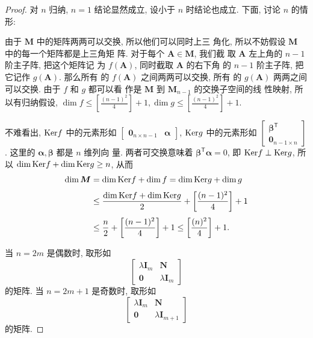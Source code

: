 \documentclass[a4paper, 12pt, UTF8]{ctexart}
\begin{document}
{\color{GoogleRed}
  \begin{proof}
      对 $n$ 归纳, $n=1$ 结论显然成立, 设小于 $n$ 时结论也成立. 下面,
      讨论 $n$ 的情形:

      由于 $\boldsymbol{M}$ 中的矩阵两两可以交换, 所以他们可以同时上三
      角化, 所以不妨假设 $\boldsymbol{M}$ 中的每一个矩阵都是上三角矩
      阵. 对于每个 $\boldsymbol{A} \in \boldsymbol{M}$, 我们截
      取 $\boldsymbol{A}$ 左上角的 $n-1$ 阶主子阵, 把这个矩阵记
      为 $f(\boldsymbol{A})$, 同时截取 $\boldsymbol{A}$ 的右下角
      的 $n-1$ 阶主子阵, 把它记作 $g(\boldsymbol{A})$. 那么所有
      的 $f(\boldsymbol{A})$ 之间两两可以交换, 所有
      的 $g(\boldsymbol{A})$ 两两之间可以交换. 由于 $f$ 和 $g$ 都可以看
      作是 $\boldsymbol{M}$ 到 $\boldsymbol{M}_{n-1}$ 的交换子空间的线
      性映射, 所以有归纳假设,
      $\dim f \leq \left[ \frac{(n-1)^{2}}{4} \right]+1, \dim g \leq
      \left[ \frac{(n-1)^{2}}{4} \right]+1$.

      不难看出, ${\rm Ker} f$ 中的元素形如 $
      \begin{bmatrix}
          \boldsymbol{0}_{n\times n-1} & \bm{\alpha}
      \end{bmatrix}$, ${\rm Ker} g$ 中的元素形如
      $\begin{bmatrix} \bm{\beta}^{\mathsf T} \\
          \boldsymbol{0}_{n-1\times n}
      \end{bmatrix}$. 这里的 $\bm{\alpha}, \bm{\beta}$ 都是 $n$ 维列向
      量. 两者可交换意味着 $\bm{\beta}^{\mathsf T} \bm{\alpha} =
      0$, 即 ${\rm Ker} f\perp {\rm Ker} g$, 所以
      $\dim {\rm Ker} f + \dim {\rm Ker} g \geq n$, 从而
      \[
          \begin{aligned}
              \dim \boldsymbol{M} & = \dim {\rm Ker} f + \dim f =  \dim {\rm Ker} g + \dim g \\[3pt]
              &\leq \frac{\dim {\rm Ker} f + \dim {\rm Ker} g}{2} + \left[ \frac{(n-1)^{2}}{4} \right] + 1 \\[3pt]
              &\leq \frac{n}{2} + \left[ \frac{(n-1)^{2}}{4} \right] + 1 \leq \left[ \frac{(n)^{2}}{4} \right] + 1.
          \end{aligned}
      \]

      当 $n = 2m$ 是偶数时, 取形如
      \[
          \begin{bmatrix}
              \lambda \boldsymbol{I}_{m} & \boldsymbol{N}
              \\
              \boldsymbol{0} & \lambda\boldsymbol{I}_{m}
          \end{bmatrix}
      \]
      的矩阵. 当 $n = 2m+1$ 是奇数时, 取形如
      \[
          \begin{bmatrix}
              \lambda \boldsymbol{I}_{m} & \boldsymbol{N}
              \\
              \boldsymbol{0} & \lambda\boldsymbol{I}_{m+1}
          \end{bmatrix}
      \]
      的矩阵.
      
  \end{proof}
}
\end{document}
